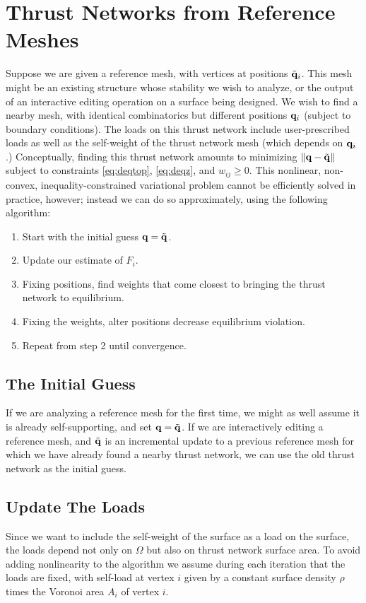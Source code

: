 \documentclass[annual]{acmsiggraph}
\begin{document}
\section{Thrust Networks from Reference Meshes} \label{sec:opt}
Suppose we are given a reference mesh, with vertices at positions $\tilde{{\mathbf q}}_i$. This mesh might be an existing structure whose stability we wish to analyze, or the output of an interactive editing operation on a surface being designed. We wish to find a nearby mesh, with identical combinatorics but different positions ${\mathbf q}_i$ (subject to boundary conditions). The loads on this thrust network include user-prescribed loads as well as the self-weight of the thrust network mesh (which depends on ${\mathbf q}_i$.) Conceptually, finding this thrust network amounts to minimizing $\|{\mathbf q} - \tilde{{\mathbf q}}\|$ subject to constraints \eqref{eq:deqtop}, \eqref{eq:deqz}, and $w_{ij} \geq 0$. This nonlinear, non-convex, inequality-constrained variational problem cannot be efficiently solved in practice, however; instead we can do so approximately, using the following algorithm:
\begin{enumerate}
\item Start with the initial guess ${\mathbf q} = \tilde{{\mathbf q}}$.
\item Update our estimate of $F_i$.
\item Fixing positions, find weights that come closest to bringing the thrust network to equilibrium.
\item Fixing the weights, alter positions decrease equilibrium violation.
\item Repeat from step 2 until convergence.
\end{enumerate}

\subsection{The Initial Guess} \label{sec:optinit}
If we are analyzing a reference mesh for the first time, we might as well assume it is already self-supporting, and set ${\mathbf q} = \tilde{{\mathbf q}}$. If we are interactively editing a reference mesh, and $\tilde{{\mathbf q}}$ is an incremental update to a previous reference mesh for which we have already found a nearby thrust network, we can use the old thrust network as the initial guess.

\subsection{Update The Loads}
Since we want to include the self-weight of the surface as a load on the surface, the loads depend not only on $\Omega$ but also on thrust network surface area. To avoid adding nonlinearity to the algorithm we assume during each iteration that the loads are fixed, with self-load at vertex $i$ given by a constant surface density $\rho$ times the Voronoi area $A_i$ of vertex $i$.
\end{document}
